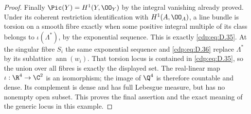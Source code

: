 \begin{proof}
Finally $\Pic(Y)=H^1(Y,\OO_Y)$ by the integral vanishing
already proved. Under its coherent restriction
identification with $H^1(A,\OO_A)$, a line bundle is
torsion on a smooth fibre exactly when some positive
integral multiple of its class belongs to
$\iota(\Lambda^*)$, by the exponential sequence.
This is exactly \eqref{cdp:eq:D.35}. At the singular fibre $S_i$
the same exponential sequence and \eqref{cdp:eq:D.36} replace
$\Lambda^*$ by its sublattice $\operatorname{ann}(w_i)$.
That torsion locus is contained in \eqref{cdp:eq:D.35}, so the union
over all fibres is exactly the displayed set. The
real-linear map $\iota:\R^4\to\C^2$ is an isomorphism;
the image of $\Q^4$ is therefore countable and dense.
Its complement is dense and has full Lebesgue measure,
but has no nonempty open subset. This proves the final
assertion and the exact meaning of the generic locus
in this example.
\end{proof}

